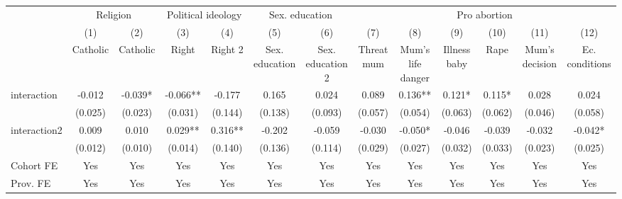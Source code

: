 {
\def\sym#1{\ifmmode^{#1}\else\(^{#1}\)\fi}
\begin{tabular}{l*{12}{c}}
\hline\hline
                    &\multicolumn{2}{c}{Religion}   &\multicolumn{2}{c}{Political ideology}&\multicolumn{2}{c}{Sex. education}&\multicolumn{6}{c}{Pro abortion}                                                               \\\cmidrule(lr){2-3}\cmidrule(lr){4-5}\cmidrule(lr){6-7}\cmidrule(lr){8-13}
                    &\multicolumn{1}{c}{(1)}&\multicolumn{1}{c}{(2)}&\multicolumn{1}{c}{(3)}&\multicolumn{1}{c}{(4)}&\multicolumn{1}{c}{(5)}&\multicolumn{1}{c}{(6)}&\multicolumn{1}{c}{(7)}&\multicolumn{1}{c}{(8)}&\multicolumn{1}{c}{(9)}&\multicolumn{1}{c}{(10)}&\multicolumn{1}{c}{(11)}&\multicolumn{1}{c}{(12)}\\
                    &\multicolumn{1}{c}{Catholic}&\multicolumn{1}{c}{Catholic}&\multicolumn{1}{c}{Right}&\multicolumn{1}{c}{Right 2}&\multicolumn{1}{c}{Sex. education}&\multicolumn{1}{c}{Sex. education 2}&\multicolumn{1}{c}{Threat mum}&\multicolumn{1}{c}{Mum's life danger}&\multicolumn{1}{c}{Illness baby}&\multicolumn{1}{c}{Rape}&\multicolumn{1}{c}{Mum's decision}&\multicolumn{1}{c}{Ec. conditions}\\
\hline
interaction         &      -0.012   &      -0.039*  &      -0.066** &      -0.177   &       0.165   &       0.024   &       0.089   &       0.136** &       0.121*  &       0.115*  &       0.028   &       0.024   \\
                    &     (0.025)   &     (0.023)   &     (0.031)   &     (0.144)   &     (0.138)   &     (0.093)   &     (0.057)   &     (0.054)   &     (0.063)   &     (0.062)   &     (0.046)   &     (0.058)   \\
interaction2        &       0.009   &       0.010   &       0.029** &       0.316** &      -0.202   &      -0.059   &      -0.030   &      -0.050*  &      -0.046   &      -0.039   &      -0.032   &      -0.042*  \\
                    &     (0.012)   &     (0.010)   &     (0.014)   &     (0.140)   &     (0.136)   &     (0.114)   &     (0.029)   &     (0.027)   &     (0.032)   &     (0.033)   &     (0.023)   &     (0.025)   \\
Cohort FE           &         Yes   &         Yes   &         Yes   &         Yes   &         Yes   &         Yes   &         Yes   &         Yes   &         Yes   &         Yes   &         Yes   &         Yes   \\
Prov. FE            &         Yes   &         Yes   &         Yes   &         Yes   &         Yes   &         Yes   &         Yes   &         Yes   &         Yes   &         Yes   &         Yes   &         Yes   \\

\end{tabular}}
